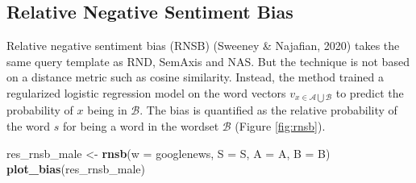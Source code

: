 \documentclass[english,man,mask]{apa6}
\newenvironment{Shaded}{\begin{snugshade}}{\end{snugshade}}
\newcommand{\DataTypeTok}[1]{\textcolor[rgb]{0.13,0.29,0.53}{#1}}
\newcommand{\KeywordTok}[1]{\textcolor[rgb]{0.13,0.29,0.53}{\textbf{#1}}}
\newcommand{\NormalTok}[1]{#1}
\newcommand{\StringTok}[1]{\textcolor[rgb]{0.31,0.60,0.02}{#1}}
\begin{document}
\hypertarget{relative-negative-sentiment-bias}{%
\subsection{Relative Negative Sentiment Bias}\label{relative-negative-sentiment-bias}}

Relative negative sentiment bias (RNSB) (Sweeney \& Najafian, 2020) takes the same query template as RND, SemAxis and NAS. But the technique is not based on a distance metric such as cosine similarity. Instead, the method trained a regularized logistic regression model on the word vectors \(v_{x \in \mathcal{A} \bigcup \mathcal{B}}\) to predict the probability of \(x\) being in \(\mathcal{B}\). The bias is quantified as the relative probability of the word \(s\) for being a word in the wordset \(\mathcal{B}\) (Figure \ref{fig:rnsb}).

\begin{Shaded}
\begin{Highlighting}[]
\NormalTok{res_rnsb_male <-}\StringTok{ }\KeywordTok{rnsb}\NormalTok{(}\DataTypeTok{w =}\NormalTok{ googlenews, }\DataTypeTok{S =}\NormalTok{ S, }\DataTypeTok{A =}\NormalTok{ A, }\DataTypeTok{B =}\NormalTok{ B)}
\KeywordTok{plot_bias}\NormalTok{(res_rnsb_male)}
\end{Highlighting}
\end{Shaded}
\end{document}
